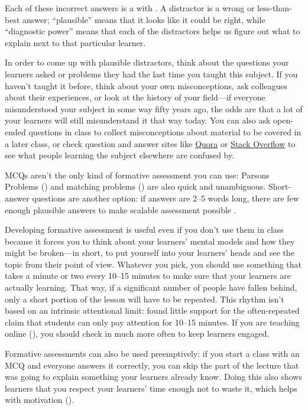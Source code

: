 Each of these incorrect answers is a
 with
.  A distractor is a
wrong or less-than-best answer; ``plausible'' means that it looks like
it could be right, while ``diagnostic power'' means that each of the
distractors helps us figure out what to explain next to that
particular learner.

In order to come up with plausible distractors, think about the
questions your learners asked or problems they had the last time you
taught this subject.  If you haven't taught it before, think about
your own misconceptions, ask colleagues about their experiences, or
look at the history of your field---if everyone misunderstood your
subject in some way fifty years ago, the odds are that a lot of your
learners will still misunderstand it that way today. You can also ask
open-ended questions in class to collect misconceptions about material
to be covered in a later class, or check question and answer sites
like \href{http://www.quora.com}{Quora} or
\href{http://stackoverflow.com}{Stack Overflow} to see what people
learning the subject elsewhere are confused by.

MCQs aren't the only kind of formative assessment you can use: Parsons
Problems () and matching problems
() are also quick and unambiguous.
Short-answer questions are another option: if answers are 2--5 words
long, there are few enough plausible answers to make scalable
assessment possible \cite{Mill2016a}.

Developing formative assessment is useful even if you don't use them
in class because it forces you to think about your learners' mental
models and how they might be broken---in short, to put yourself into
your learners' heads and see the topic from their point of view.
Whatever you pick, you should use something that takes a minute or two
every 10--15 minutes to make sure that your learners are actually
learning.  That way, if a significant number of people have fallen
behind, only a short portion of the lesson will have to be repeated.
This rhythm isn't based on an intrinsic attentional limit:
\cite{Wils2007} found little support for the often-repeated claim that
students can only pay attention for 10--15 minutes.  If you are
teaching online (), you should check in much more
often to keep learners engaged.

Formative assessments can also be used preemptively: if you start a
class with an MCQ and everyone answers it correctly, you can skip the
part of the lecture that was going to explain something your learners
already know.  Doing this also shows learners that you respect your
learners' time enough not to waste it, which helps with motivation
().

